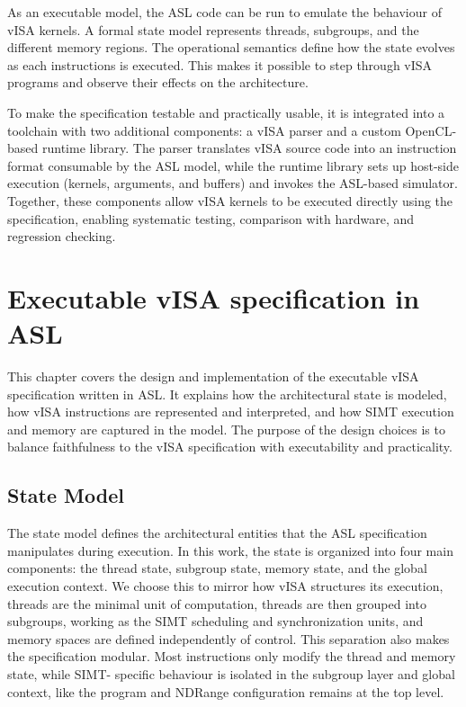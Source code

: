 As an executable model, the ASL code can be run to emulate the behaviour of
vISA kernels. A formal state model represents threads, subgroups, and the
different memory regions. The operational semantics define how the state
evolves as each instructions is executed. This makes it possible to step
through vISA programs and observe their effects on the architecture.

To make the specification testable and practically usable, it is integrated
into a toolchain with two additional components: a vISA parser and a custom
OpenCL-based runtime library. The parser translates vISA source code into an
instruction format consumable by the ASL model, while the runtime library sets
up host-side execution (kernels, arguments, and buffers) and invokes the
ASL-based simulator. Together, these components allow vISA kernels to be
executed directly using the specification, enabling systematic testing,
comparison with hardware, and regression checking.

\chapter{Executable vISA specification in ASL}

This chapter covers the design and implementation of the executable vISA
specification written in ASL. It explains how the architectural state is
modeled, how vISA instructions are represented and interpreted, and how SIMT
execution and memory are captured in the model. The purpose of the design
choices is to balance faithfulness to the vISA specification with executability
and practicality.

\section{State Model}
The state model defines the architectural entities that the ASL specification
manipulates during execution. In this work, the state is organized into four
main components: the thread state, subgroup state, memory state, and the global
execution context. We choose this to mirror how vISA structures its execution,
threads are the minimal unit of computation, threads are then grouped into
subgroups, working as the SIMT scheduling and synchronization units, and memory
spaces are defined independently of control. This separation also makes the
specification modular. Most instructions only modify the thread and memory
state, while SIMT- specific behaviour is isolated in the subgroup layer and
global context, like the program and NDRange configuration remains at the top
level.

